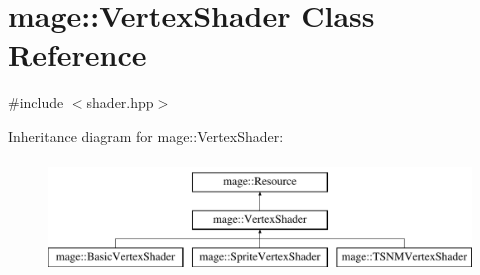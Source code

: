 \hypertarget{classmage_1_1_vertex_shader}{}\section{mage\+:\+:Vertex\+Shader Class Reference}
\label{classmage_1_1_vertex_shader}


{\ttfamily \#include $<$shader.\+hpp$>$}

Inheritance diagram for mage\+:\+:Vertex\+Shader\+:\begin{figure}[H]
\begin{center}
\leavevmode
\includegraphics[height=3.000000cm]{classmage_1_1_vertex_shader}
\end{center}
\end{figure}
